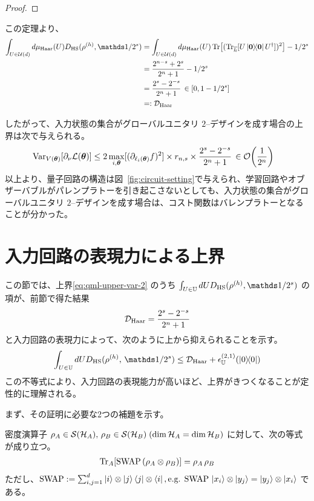 \begin{proof}
\end{proof}


この定理より、
\begin{align}
    \int_{U\in\calU(d)} d\mu_{\Haar}(U) D_{\HS}(\rho^{(h)},\bbid/2^s)
    &= \int_{U\in\calU(d)} d\mu_{\Haar}(U) \Tr[(\Tr_{\bar{h}}[U\dyad{\bs{0}} U\dg])^2] - 1/2^s \nonumber\\
    &= \frac{2^{n-s} + 2^s}{2^n + 1} - 1/2^s \nonumber\\
    &= \frac{2^s - 2^{-s}}{2^n + 1} \,\in [0,1 - 1/2^s]\\
    &=: \calD_{\Haar}
\end{align}

したがって、入力状態の集合がグローバルユニタリ $2$--デザインを成す場合の上界は次で与えられる。
\begin{align}\label{eq:qml-upper-var-haar}
    \Var_{V(\bs{\th})}[\pd_\nu \calL(\bs{\th})]
    &\leq
    2\max_{i,\bs{\th}} [(\pd_{\ell_i(\bs{\th})}f)^2]
    \times r_{n,s}
    \times \frac{2^s - 2^{-s}}{2^n + 1} \,\in \order{\frac{1}{2^n}}
\end{align}
以上より、量子回路の構造は図~\ref{fig:circuit-setting}で与えられ、学習回路やオブザーバブルがパレンプラトーを引き起こさないとしても、入力状態の集合がグローバルユニタリ $2$--デザインを成す場合は、コスト関数はバレンプラトーとなることが分かった。



\section{入力回路の表現力による上界}\label{sec:qml-var-expressibility}
この節では、上界\eqref{eq:qml-upper-var-2} のうち $\int_{U\in\bbU} dU D_{\HS} (\rho^{(h)} , \bbid/2^s )$ の項が、前節で得た結果 
$$
    \mathcal{D}_{\mathrm{Haar}} = \frac{2^s - 2^{-s}}{2^n + 1}
$$
と入力回路の表現力によって、次のように上から抑えられることを示す。
$$
    \int_{U\in\bbU} dU D_{\HS} ( \rho^{(h)} ,\, \bbid/2^s ) \leq \calD_{\Haar} + \epsilon_{\bbU}^{(2,1)}(\dyad{0})
$$
この不等式により、入力回路の表現能力が高いほど、上界がきつくなることが定性的に理解される。

まず、その証明に必要な2つの補題を示す。
\begin{screen}
    \begin{lemma}\label{lemma:swap1}
        密度演算子 $\rho_A \in \mathcal{S}(\mathcal{H}_A)  ,\,\rho_B \in \mathcal{S}(\mathcal{H}_B) \; (\dim{\mathcal{H}_A} = \dim{\mathcal{H}_B})$ に対して、次の等式が成り立つ。
        \begin{align}\label{eq:swap1}
            \Tr_A[\mathrm{SWAP}\,(\rho_A \otimes \rho_B)] = \rho_A\,\rho_B
        \end{align}
        ただし、$\mathrm{SWAP} := \sum_{i,j=1}^d \ket{i}\otimes\ket{j}\bra{j}\otimes\bra{i}, \text{e.g. } \mathrm{SWAP}\,\ket{x_i}\otimes\ket{y_j} = \ket{y_j}\otimes\ket{x_i}$ である。
    \end{lemma}
\end{screen}

